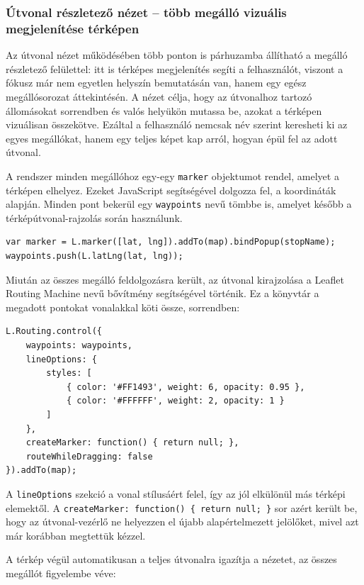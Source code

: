 \subsubsection{Útvonal részletező nézet – több megálló vizuális megjelenítése térképen}

Az útvonal nézet működésében több ponton is párhuzamba állítható a megálló részletező felülettel: itt is térképes megjelenítés segíti a felhasználót, viszont a fókusz már nem egyetlen helyszín bemutatásán van, hanem egy egész megállósorozat áttekintésén. A nézet célja, hogy az útvonalhoz tartozó állomásokat sorrendben és valós helyükön mutassa be, azokat a térképen vizuálisan összekötve. Ezáltal a felhasználó nemcsak név szerint keresheti ki az egyes megállókat, hanem egy teljes képet kap arról, hogyan épül fel az adott útvonal.

A rendszer minden megállóhoz egy-egy \texttt{marker} objektumot rendel, amelyet a térképen elhelyez. Ezeket JavaScript segítségével dolgozza fel, a koordináták alapján. Minden pont bekerül egy \texttt{waypoints} nevű tömbbe is, amelyet később a térképútvonal-rajzolás során használunk.

\begin{lstlisting}
var marker = L.marker([lat, lng]).addTo(map).bindPopup(stopName);
waypoints.push(L.latLng(lat, lng));
\end{lstlisting}

Miután az összes megálló feldolgozásra került, az útvonal kirajzolása a Leaflet Routing Machine nevű bővítmény segítségével történik. Ez a könyvtár a megadott pontokat vonalakkal köti össze, sorrendben:

\begin{lstlisting}
L.Routing.control({
    waypoints: waypoints,
    lineOptions: {
        styles: [
            { color: '#FF1493', weight: 6, opacity: 0.95 },
            { color: '#FFFFFF', weight: 2, opacity: 1 }
        ]
    },
    createMarker: function() { return null; },
    routeWhileDragging: false
}).addTo(map);
\end{lstlisting}

A \texttt{lineOptions} szekció a vonal stílusáért felel, így az jól elkülönül más térképi elemektől. A \texttt{createMarker: function() \{ return null; \}} sor azért került be, hogy az útvonal-vezérlő ne helyezzen el újabb alapértelmezett jelölőket, mivel azt már korábban megtettük kézzel.

A térkép végül automatikusan a teljes útvonalra igazítja a nézetet, az összes megállót figyelembe véve:

